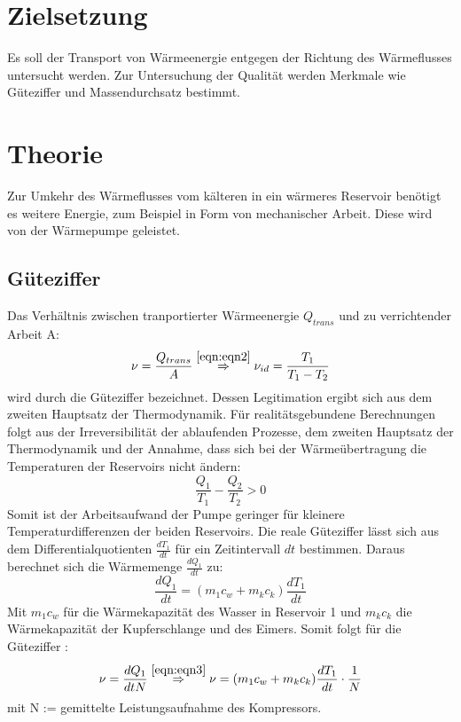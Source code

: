 \section{Zielsetzung}
\label{sec:Ziel}
Es soll der Transport von Wärmeenergie entgegen der Richtung des Wärmeflusses untersucht werden.
Zur Untersuchung der Qualität werden Merkmale wie Güteziffer und Massendurchsatz bestimmt.

\section{Theorie}
\label{sec:Theorie}
Zur Umkehr des Wärmeflusses vom kälteren in ein wärmeres Reservoir benötigt es weitere Energie, zum Beispiel in Form von mechanischer Arbeit.
Diese wird von der Wärmepumpe geleistet.

\subsection{Güteziffer}
\label{sec:Güteziffer}
Das Verhältnis zwischen tranportierter Wärmeenergie $Q_{trans}$ und zu verrichtender Arbeit A:
\begin{equation}
  \nu = \frac{Q_{trans}}{A} \stackrel{\ref{eqn:eqn2}}\Rightarrow \nu_{id} = \frac{T_1}{T_1-T_2}
  \label{eqn:eqn1}
\end{equation}
wird durch die Güteziffer \nu bezeichnet.
Dessen Legitimation ergibt sich aus dem zweiten Hauptsatz der Thermodynamik.
Für realitätsgebundene Berechnungen folgt aus der Irreversibilität der ablaufenden Prozesse,
dem zweiten Hauptsatz der Thermodynamik und der Annahme, dass sich bei der Wärmeübertragung die Temperaturen der Reservoirs nicht ändern:
\begin{equation}
  \frac{Q_1}{T_1} - \frac{Q_2}{T_2} > 0
  \label{eqn:eqn2}
\end{equation}
Somit ist der Arbeitsaufwand der Pumpe geringer für kleinere Temperaturdifferenzen der beiden Reservoirs.
Die reale Güteziffer \nu lässt sich aus dem Differentialquotienten $\frac{dT_1}{dt}$ für ein Zeitintervall $dt$ bestimmen.
Daraus berechnet sich die Wärmemenge $\frac{dQ_1}{dt}$ zu:
\begin{equation}
  \frac{dQ_1}{dt} = (m_1c_w + m_kc_k) \frac{dT_1}{dt}
  \label{eqn:eqn3}
\end{equation}
Mit $m_1c_w$ für die Wärmekapazität des Wasser in Reservoir 1 und $m_kc_k$ die Wärmekapazität der Kupferschlange und des Eimers.
Somit folgt für die Güteziffer \nu :
\begin{equation}
  \nu = \frac{dQ_1}{dtN} \stackrel{\ref{eqn:eqn3}}\Rightarrow \nu = (m_1c_w + m_kc_k) \frac{dT_1}{dt} \cdot \frac{1}{N}
  \label{eqn:eqn4}
\end{equation}
mit N := gemittelte Leistungsaufnahme des Kompressors.

